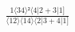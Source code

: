 \documentclass[varwidth, border=5pt]{standalone}
\begin{document}
\begin{my}
$\begin{gathered}
\scriptscriptstyle\frac{1⟨34⟩²⟨4|2+3|1]}{⟨12⟩⟨14⟩⟨2|3+4|1]}
\end{gathered}$
\end{my}
\end{document}
